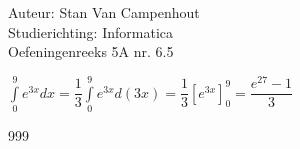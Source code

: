 \documentclass[a4paper]{article}
\begin{document}
  
\noindent \large Auteur: Stan Van Campenhout \\
\noindent \large Studierichting:  Informatica\\
\noindent \large Oefeningenreeks 5A nr. 6.5\\

\medskip

\normalsize

$ \displaystyle\int\limits_0^9e^{3x}dx = \dfrac{1}{3}\displaystyle\int\limits_0^9e^{3x}d\left(3x\right) = \dfrac{1}{3}\left[e^{3x}\right]_0^9 = \dfrac{e^{27}-1}{3} $\\

\begin{thebibliography}{999}
\end{thebibliography}
\end{document}
